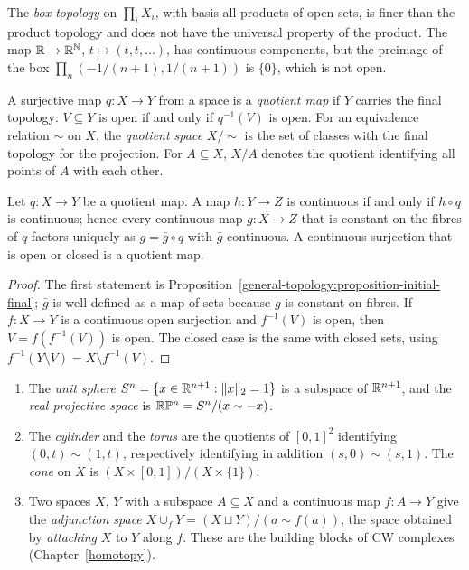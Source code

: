 \begin{counterexample}\label{general-topology:counterexample-box-topology}
The \emph{box topology} on $\prod_i X_i$, with basis all products of open sets, is finer than the product topology and does not have the universal
property of the product. The map $\mathbb{R} \to \mathbb{R}^{\mathbb{N}}$, $t \mapsto (t, t, \ldots)$, has continuous components, but the preimage of the box
$\prod_{n} (-1/(n+1), 1/(n+1))$ is $\{0\}$, which is not open.
\end{counterexample}

\begin{definition}\label{general-topology:definition-quotient}
A surjective map $q \colon X \to Y$ from a space is a \emph{quotient map} if $Y$ carries the final topology: $V \subseteq Y$ is open if and only if
$q^{-1}(V)$ is open. For an equivalence relation $\sim$ on $X$, the \emph{quotient space} $X/{\sim}$ is the set of classes with the final topology for
the projection. For $A \subseteq X$, $X/A$ denotes the quotient identifying all points of $A$ with each other.
\end{definition}

\begin{proposition}\label{general-topology:proposition-quotient}
Let $q \colon X \to Y$ be a quotient map. A map $h \colon Y \to Z$ is continuous if and only if $h \circ q$ is continuous; hence every continuous map
$g \colon X \to Z$ that is constant on the fibres of $q$ factors uniquely as $g = \bar{g} \circ q$ with $\bar{g}$ continuous. A continuous surjection that
is open or closed is a quotient map.
\end{proposition}

\begin{proof}
The first statement is Proposition~\ref{general-topology:proposition-initial-final}; $\bar{g}$ is well defined as a map of sets because $g$ is
constant on fibres. If $f \colon X \to Y$ is a continuous open surjection and $f^{-1}(V)$ is open, then $V = f(f^{-1}(V))$ is open. The closed case
is the same with closed sets, using $f^{-1}(Y \setminus V) = X \setminus f^{-1}(V)$.
\end{proof}

\begin{example}\label{general-topology:example-quotients}
\begin{enumerate}
\item The \emph{unit sphere} $S^n = \{x \in \mathbb{R}^{n+1} : \|x\|_2 = 1\}$ is a subspace of $\mathbb{R}^{n+1}$, and the \emph{real projective space} is
$\mathbb{R}\mathbb{P}^n = S^n/(x \sim -x)$.
\item The \emph{cylinder} and the \emph{torus} are the quotients of $[0,1]^2$ identifying $(0, t) \sim (1, t)$, respectively identifying in addition
$(s, 0) \sim (s, 1)$. The \emph{cone} on $X$ is $(X \times [0,1])/(X \times \{1\})$.
\item Two spaces $X$, $Y$ with a subspace $A \subseteq X$ and a continuous map $f \colon A \to Y$ give the \emph{adjunction space}
$X \cup_f Y = (X \sqcup Y)/(a \sim f(a))$, the space obtained by \emph{attaching} $X$ to $Y$ along $f$. These are the building blocks of CW
complexes (Chapter~\ref{homotopy}).
\end{enumerate}
\end{example}

